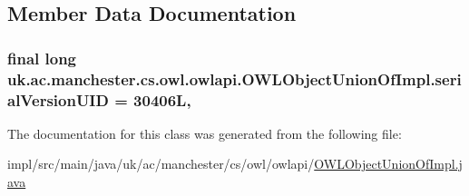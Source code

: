 \subsection{Member Data Documentation}
\hypertarget{classuk_1_1ac_1_1manchester_1_1cs_1_1owl_1_1owlapi_1_1_o_w_l_object_union_of_impl_a36814d6c8982faba27d545b24447963d}{
\subsubsection[{serial\-Version\-U\-I\-D}]{\setlength{\rightskip}{0pt plus 5cm}final long uk.\-ac.\-manchester.\-cs.\-owl.\-owlapi.\-O\-W\-L\-Object\-Union\-Of\-Impl.\-serial\-Version\-U\-I\-D = 30406\-L\hspace{0.3cm}{\ttfamily [static]}, {\ttfamily [private]}}}\label{classuk_1_1ac_1_1manchester_1_1cs_1_1owl_1_1owlapi_1_1_o_w_l_object_union_of_impl_a36814d6c8982faba27d545b24447963d}


The documentation for this class was generated from the following file\-:\begin{DoxyCompactItemize}
\item 
impl/src/main/java/uk/ac/manchester/cs/owl/owlapi/\hyperlink{_o_w_l_object_union_of_impl_8java}{O\-W\-L\-Object\-Union\-Of\-Impl.\-java}\end{DoxyCompactItemize}

